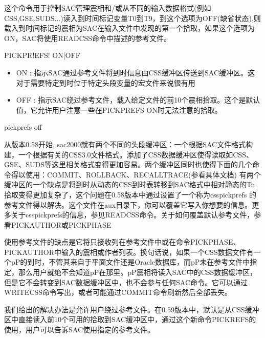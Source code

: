 \label{cmd:pickprefs}

这个命令用于控制SAC管理震相和/或从不同的输入数据格式(例如CSS,GSE,SUDS...)读入到时间标记变量T0到T9，到这个选项为OFF(缺省状态),则载入到时间标记的震相为SAC在输入文件中发现的第一个拾取，如果这个选项为ON，SAC将使用READCSS命令中描述的参考文件。

\begin{SACSTX}
PICKPR!EFS! ON|OFF
\end{SACSTX}

\begin{itemize}
\item ON : 指示SAC通过参考文件将到时信息由CSS缓冲区传送到SAC缓冲区。这对于需要特定到时位于特定头段变量的宏文件来说很有用
\item OFF : 指示SAC绕过参考文件，载入给定文件的前10个震相拾取。这个是默认值，它允许用户注意一些在PICKPREFS ON时无法注意的拾取。
\end{itemize}

\begin{SACDFT}
pickprefs off
\end{SACDFT}

从版本0.58开始, sac2000就有两个不同的头段缓冲区：一个根据SAC文件格式构建，一个根据有关的CSS3.0文件格式。添加了CSS数据缓冲区使得读取如CSS、GSE、SUDS等这里相关格式变得更加容易。两个缓冲区同时也使得下面的几个命令得以使用：COMMIT、ROLLBACK、RECALLTRACE(参看具体文档)
有两个缓冲区的一个缺点是将到时从动态的CSS到时表转移到SAC格式中相对静态的Tn拾取变得更加复杂了，这个问题在0.58版本中通过设置了一个称为csspickprefs	的参考文件得以解决。这个文件在aux目录下，你可以覆盖它写入你想要的信息。更	多关于csspickprefs的信息，参见READCSS命令。关于如何覆盖默认参考文件，参看PICKAUTHOR或PICKPHASE

使用参考文件的缺点是它将只接收列在参考文件中或在命令PICKPHASE、PICKAUTHOR中输入的震相或作者列表。换句话说，如果一个CSS数据文件有一个pP的到时，不管其来自于平面文件还是Oracle数据库，而pP未在参考文件中指定，那么用户就绝不会知道pP在那里。pP震相将读入SAC中的CSS数据缓冲区，但是它不会转变到SAC数据缓冲区中，也不会参与任何SAC命令。它可以通过WRITECSS命令写出，或者可能通过COMMIT命令刷新然后全部丢失。

我们给出的解决办法是允许用户绕过参考文件。在0.59版本中，默认是从CSS缓冲区中直接读入前10个可用的拾取到SAC缓冲区中，通过这个新命令PICKREFS的使用，用户可以告诉SAC使用指定的参考文件。
